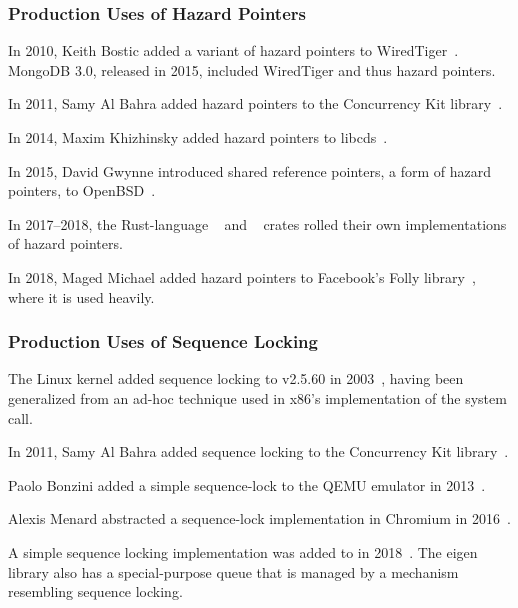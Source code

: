 \subsubsection{Production Uses of Hazard Pointers}
\label{sec:defer:Production Uses of Hazard Pointers}

In 2010, Keith Bostic added a variant of hazard pointers to
WiredTiger~\cite{KeithBostic2010WiredTigerhazptr}.
MongoDB 3.0, released in 2015, included WiredTiger and thus hazard pointers.

In 2011, Samy Al Bahra added hazard pointers to the Concurrency Kit
library~\cite{SamyAlBahra2011ckhp}.

In 2014, Maxim Khizhinsky added hazard pointers to
libcds~\cite{MaximKhizhinsky2014libcdsHazptr}.

In 2015, David Gwynne introduced shared reference pointers, a form
of hazard pointers, to OpenBSD~\cite{DavidGwynne2015srp}.

In 2017--2018, the Rust-language
~\cite{MichalVaner2018arc-swapHazptr} and
~\cite{crates.io.user.ticki2017concHazptr}
crates rolled their own implementations of hazard pointers.

In 2018, Maged Michael added hazard pointers to Facebook's Folly
library~\cite{MagedMichael2018FollyHazptr}, where it is used heavily.

\subsubsection{Production Uses of Sequence Locking}
\label{sec:defer:Production Uses of Sequence Locking}

The Linux kernel added sequence locking to v2.5.60 in
2003~\cite{JonathanCorbet2003seqlock}, having been generalized from
an ad-hoc technique used in x86's implementation of the
 system call.

In 2011, Samy Al Bahra added sequence locking to the Concurrency Kit
library~\cite{SamyAlBahra2011ckseqlock}.

Paolo Bonzini added a simple sequence-lock to the QEMU emulator in
2013~\cite{PaoloBonzini2013QEMUseqlock}.

Alexis Menard abstracted a sequence-lock implementation in Chromium
in 2016~\cite{AlexisMenard2016ChromiumSeqLock}.

A simple sequence locking implementation was added to 
in 2018~\cite{DavidGoldblatt2018seqlock}.
The eigen library also has a special-purpose queue that is managed by
a mechanism resembling sequence locking.

